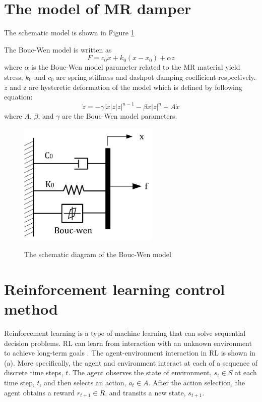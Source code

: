 \section{The model of MR damper}


The schematic model is shown in Figure \ref{bouc-wen}

The Bouc-Wen model is written as 
\begin{equation}F=c_0 \dot{x}+k_0(x-x_0)+\alpha z\end{equation}
where $\alpha$ is the Bouc-Wen model parameter related to the MR material yield stress; $k_0$ and $c_0$ are spring stiffness and dashpot damping coefficient respectively. $\dot{z}$ and z are hysteretic deformation of the model which is defined by following equation:
\begin{equation}\dot{z}=-\gamma|\dot{x}|z|z|^{n-1}-\beta \dot{x}|z|^n+A\dot{x}\end{equation}
where $A$, $\beta$, and $\gamma$ are the Bouc-Wen model parameters.

\begin{figure}[!h]
\centering
{\includegraphics[width=0.6\textwidth]{bouc-wen.jpg}} 
\caption{The schematic diagram of the Bouc-Wen model} 
\label{bouc-wen} 
\end{figure} 

\section{Reinforcement learning control method}

Reinforcement learning is a type of machine learning that can solve sequential decision problems. RL can learn from interaction with an unknown environment to achieve long-term goals \citep{sutton}. The agent-environment interaction in RL is shown in (a). More specifically, the agent and environment interact at each of a sequence of discrete time steps, $t$. The agent observes the state of environment, $s_t \in S$ at each time step, $t$, and then selects an action, $a_t \in A$. After the action selection, the agent obtains a reward $r_{t+1} \in R$, and transits a new state, $s_{t+1}$. 

